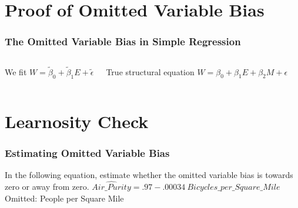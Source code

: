 \documentclass[12pt, block=fill]{beamer}
\newcommand{\alex}[1]{\textcolor{berkeleyYellow}{#1}}
\begin{document}
\section{Proof of Omitted Variable Bias}


\begin{frame}[t]
  \frametitle{The Omitted Variable Bias in Simple Regression}
    \begin{columns}[t]
    \begin{block}{We fit}
   \vspace{.1cm}        $ W  = \tilde{\beta}_0 + \tilde{\beta}_1  E + \tilde \epsilon$
    \end{block}
    \begin{block}{True structural equation}
  \vspace{.2cm}     $W = \beta_0 + \beta_1 E + \beta_2 M + \epsilon$
    \end{block}
    \end{columns}


    
    
 \end{frame}



\section{Learnosity Check}

\begin{frame}
  \frametitle{Estimating Omitted Variable Bias}
  
  In the following equation, estimate whether the omitted variable
  bias is towards zero or away from zero. 
  $ \widehat{Air\_Purity} =  .97 - .00034 \ Bicycles\_per\_Square\_Mile$
  Omitted: People per Square Mile
 \note[item]{\alex{We should totally have them code this as well.}} 
  \end{frame}
\end{document}
